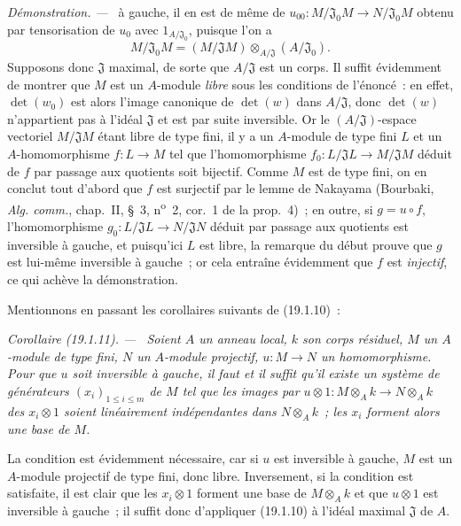 \documentclass[10pt,oneside]{book}
\makeatletter
\newcommand{\setmanualcurrentlabel}[1]{\def\@currentlabel{#1}}
\newenvironment{corollary}[1][]{%
  \setmanualcurrentlabel{#1}\par\medskip\noindent\itshape Corollaire (#1). ---\ }{\par}
\newenvironment{proof}{%
  \par\medskip\noindent\textit{Démonstration. ---\ }}{\par}
\makeatother
\begin{document}
\begin{proof}
à gauche, il en est de même de
$u_{00}:M/\mathfrak J_0M\to N/\mathfrak J_0M$ obtenu par tensorisation de
$u_0$ avec $1_{A/\mathfrak J_0}$, puisque l'on a
\[
  M/\mathfrak J_0M=(M/\mathfrak JM)\otimes_{A/\mathfrak J}(A/\mathfrak J_0).
\]
Supposons donc $\mathfrak J$ maximal, de sorte que $A/\mathfrak J$ est un
corps. Il suffit évidemment de montrer que $M$ est un $A$-module \emph{libre}
sous les conditions de l'énoncé~: en effet, $\det(w_0)$ est alors l'image
canonique de $\det(w)$ dans $A/\mathfrak J$, donc $\det(w)$ n'appartient pas à
l'idéal $\mathfrak J$ et est par suite inversible. Or le
$(A/\mathfrak J)$-espace vectoriel $M/\mathfrak JM$ étant libre de type fini,
il y a un $A$-module de type fini $L$ et un $A$-homomorphisme $f:L\to M$ tel
que l'homomorphisme $f_0:L/\mathfrak JL\to M/\mathfrak JM$ déduit de $f$ par
passage aux quotients soit bijectif. Comme $M$ est de type fini, on en conclut
tout d'abord que $f$ est surjectif par le lemme de Nakayama (Bourbaki,
\emph{Alg. comm.}, chap.~II, §~3, n\textsuperscript{o}~2, cor.~1 de la
prop.~4)~; en outre, si $g=u\circ f$, l'homomorphisme
$g_0:L/\mathfrak JL\to N/\mathfrak JN$ déduit par passage aux quotients est
inversible à gauche, et puisqu'ici $L$ est libre, la remarque du début prouve
que $g$ est lui-même inversible à gauche~; or cela entraîne évidemment que
$f$ est \emph{injectif}, ce qui achève la démonstration.
\end{proof}

Mentionnons en passant les corollaires suivants de (19.1.10)~:

\begin{corollary}[19.1.11]
\label{0.19.1.11-fr}
Soient $A$ un anneau local, $k$ son corps résiduel, $M$ un $A$-module de type
fini, $N$ un $A$-module projectif, $u:M\to N$ un homomorphisme. Pour que $u$
soit inversible à gauche, il faut et il suffit qu'il existe un système de
générateurs $(x_i)_{1\leq i\leq m}$ de $M$ tel que les images par
$u\otimes 1:M\otimes_Ak\to N\otimes_Ak$ des $x_i\otimes1$ soient linéairement
indépendantes dans $N\otimes_Ak$~; les $x_i$ forment alors une base de $M$.
\end{corollary}

La condition est évidemment nécessaire, car si $u$ est inversible à gauche,
$M$ est un $A$-module projectif de type fini, donc libre. Inversement, si la
condition est satisfaite, il est clair que les $x_i\otimes1$ forment une base
de $M\otimes_Ak$ et que $u\otimes1$ est inversible à gauche~; il suffit donc
d'appliquer (19.1.10) à l'idéal maximal $\mathfrak J$ de $A$.
\end{document}
